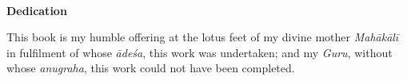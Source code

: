 \thispagestyle{empty}
~
\vfill

\begin{center}
{\huge\textbf{Dedication}}
\medskip

This book is my humble offering at the lotus feet of my divine mother \emph{Mahākālī} in fulfilment of whose \emph{ādeśa}, this work was undertaken; and my \emph{Guru}, without whose \emph{anugraha}, this work could not have been completed.
\end{center}
\vfill
